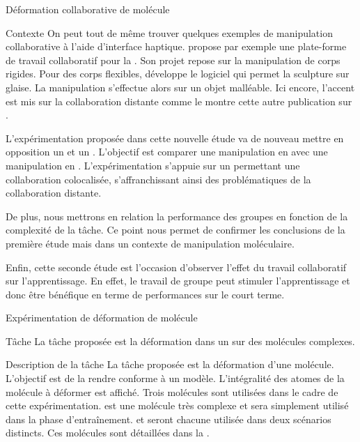 \documentclass[myfrancais]{mythesis}
\begin{document}
\begin{mychapter}{Déformation collaborative de molécule}
\begin{mysection}{Contexte}
			On peut tout de même trouver quelques exemples de manipulation collaborative à l'aide d'interface haptique.
			 propose par exemple une plate-forme de travail collaboratif pour la .
			Son projet repose sur la manipulation de corps rigides.
			Pour des corps flexibles,  développe le logiciel \myClayWorks qui permet la sculpture sur glaise.
			La manipulation s'effectue alors sur un objet malléable.
			Ici encore, l'accent est mis sur la collaboration distante comme le montre cette autre publication sur \myClayWorks {}.

			L'expérimentation proposée dans cette nouvelle étude va de nouveau mettre en opposition un  et un .
			L'objectif est comparer une manipulation  en  avec une manipulation  en .
			L'expérimentation s'appuie sur un  permettant une collaboration colocalisée, s'affranchissant ainsi des problématiques de la collaboration distante.

			De plus, nous mettrons en relation la performance des groupes en fonction de la complexité de la tâche.
			Ce point nous permet de confirmer les conclusions de la première étude mais dans un contexte de manipulation moléculaire.

			Enfin, cette seconde étude est l'occasion d'observer l'effet du travail collaboratif sur l'apprentissage.
			En effet, le travail de groupe peut stimuler l'apprentissage et donc être bénéfique en terme de performances sur le court terme.
		\end{mysection}
		\begin{mysection}{Expérimentation de déformation de molécule}
			\begin{mysubsection}[sse-exp2-Tache]{Tâche}
				La tâche proposée est la déformation dans un  sur des molécules complexes.
				\begin{mysubsubsection}{Description de la tâche}
					La tâche proposée est la déformation d'une molécule.
					L'objectif est de la rendre conforme à un modèle.
					L'intégralité des atomes de la molécule à déformer est affiché.
					Trois molécules sont utilisées dans le cadre de cette expérimentation.
					\myPrion est une molécule très complexe et sera simplement utilisé dans la phase d'entraînement.
					\myTRPZIPPER et \myTRPCAGE seront chacune utilisée dans deux scénarios distincts.
					Ces molécules sont détaillées dans la .


\end{mysubsubsection}
\end{mysubsection}
\end{mysection}
\end{mychapter}
\end{document}
